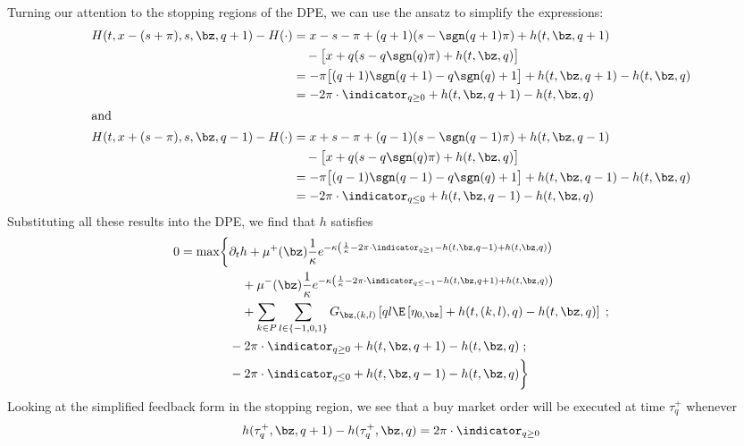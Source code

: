 \documentclass[12pt]{article}
\begin{document}
Turning our attention to the stopping regions of the DPE, we can use the ansatz to simplify the expressions:
\begin{align*}
H(t,x-(s+\pi), s, \bz, q+1) - H(\cdot) & = x - s - \pi + (q+1)(s - \sgn(q+1)\pi) + h(t, \bz, q+1) \\
& \quad - \bigl[ x + q(s - q\sgn(q)\pi) + h(t,\bz,q) \bigr] \\
& = -\pi \bigl[ (q+1)\sgn(q+1) - q\sgn(q) + 1 \bigr] + h(t, \bz, q+1) - h(t,\bz,q)  \\
& = - 2 \pi \cdot \indicator_{q \geq 0} + h(t, \bz, q+1) - h(t,\bz,q) \\
\intertext{and}
H(t,x+(s-\pi), s, \bz, q-1) - H(\cdot) & = x + s - \pi + (q-1)(s - \sgn(q-1)\pi) + h(t, \bz, q-1)\\
& \quad - \bigl[ x + q(s - q\sgn(q)\pi) + h(t,\bz,q) \bigr] \\
& = - \pi \bigl[ (q-1)\sgn(q-1) - q\sgn(q) + 1 \bigr] + h(t, \bz, q-1) - h(t,\bz,q)  \\
& = -2 \pi \cdot \indicator_{q \leq 0} + h(t, \bz, q-1) - h(t,\bz,q) \\ 
\end{align*}
Substituting all these results into the DPE, we find that $h$ satisfies
\begin{equation}\label{eq:PDEcase1}
\begin{split}
0 = \max \biggl\lbrace & \partial_t h + \mu^+(\bz) \frac{1}{\kappa} e^{ -\kappa \left( \frac{1}{\kappa} - 2 \pi \cdot \indicator_{q \geq 1} - h(t,\bz,q-1) + h(t,\bz,q)  \right)} \\
& \quad + \mu^-(\bz) \frac{1}{\kappa} e^{ -\kappa \left( \frac{1}{\kappa} - 2 \pi \cdot \indicator_{q \leq -1} - h(t,\bz,q+1) + h(t,\bz,q) \right)} \\
& \quad + \sum_{k\in P} \sum_{l \in \{-1,0,1\}} G_{\bz,(k,l)} \left[ ql \E \left[ \eta_{0,\bz} \right] + h(t,(k,l),q) - h(t,\bz,q) \right] \; ; \\
& -2 \pi \cdot \indicator_{q \geq 0} + h(t, \bz, q+1) - h(t,\bz,q)   \; ; \\
& -2 \pi \cdot \indicator_{q \leq 0} + h(t, \bz, q-1) - h(t,\bz,q)  \biggr\rbrace
\end{split}
\end{equation}
Looking at the simplified feedback form in the stopping region, we see that a buy market order will be executed at time $\tau^+_q$ whenever
\begin{equation}
\label{eq:buyMOfeedbackcase1}
h(\tau^+_q, \bz, q+1) - h(\tau^+_q,\bz,q) = 2 \pi \cdot \indicator_{q \geq 0}
\end{equation}
\end{document}
